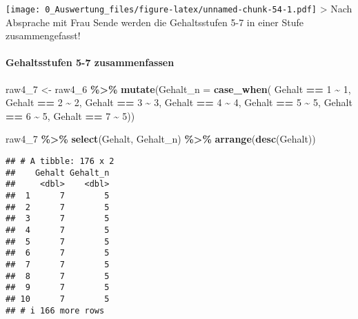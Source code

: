 \documentclass[
]{article}
\newenvironment{Shaded}{\begin{snugshade}}{\end{snugshade}}
\newcommand{\AttributeTok}[1]{\textcolor[rgb]{0.13,0.29,0.53}{#1}}
\newcommand{\DecValTok}[1]{\textcolor[rgb]{0.00,0.00,0.81}{#1}}
\newcommand{\FunctionTok}[1]{\textcolor[rgb]{0.13,0.29,0.53}{\textbf{#1}}}
\newcommand{\NormalTok}[1]{#1}
\newcommand{\OtherTok}[1]{\textcolor[rgb]{0.56,0.35,0.01}{#1}}
\newcommand{\SpecialCharTok}[1]{\textcolor[rgb]{0.81,0.36,0.00}{\textbf{#1}}}
\begin{document}
\texttt{[image: 0\_Auswertung\_files/figure-latex/unnamed-chunk-54-1.pdf]}
\textgreater{} Nach Absprache mit Frau Sende werden die Gehaltsstufen
5-7 in einer Stufe zusammengefasst!

\paragraph{Gehaltsstufen 5-7
zusammenfassen}\label{gehaltsstufen-5-7-zusammenfassen}

\begin{Shaded}
\begin{Highlighting}[]
\NormalTok{raw4\_7 }\OtherTok{\textless{}{-}}\NormalTok{ raw4\_6 }\SpecialCharTok{\%\textgreater{}\%} 
  \FunctionTok{mutate}\NormalTok{(}\AttributeTok{Gehalt\_n =} \FunctionTok{case\_when}\NormalTok{(}
\NormalTok{    Gehalt }\SpecialCharTok{==} \DecValTok{1} \SpecialCharTok{\textasciitilde{}} \DecValTok{1}\NormalTok{,}
\NormalTok{    Gehalt }\SpecialCharTok{==} \DecValTok{2} \SpecialCharTok{\textasciitilde{}} \DecValTok{2}\NormalTok{,}
\NormalTok{    Gehalt }\SpecialCharTok{==} \DecValTok{3} \SpecialCharTok{\textasciitilde{}} \DecValTok{3}\NormalTok{,}
\NormalTok{    Gehalt }\SpecialCharTok{==} \DecValTok{4} \SpecialCharTok{\textasciitilde{}} \DecValTok{4}\NormalTok{,}
\NormalTok{    Gehalt }\SpecialCharTok{==} \DecValTok{5} \SpecialCharTok{\textasciitilde{}} \DecValTok{5}\NormalTok{,}
\NormalTok{    Gehalt }\SpecialCharTok{==} \DecValTok{6} \SpecialCharTok{\textasciitilde{}} \DecValTok{5}\NormalTok{,}
\NormalTok{    Gehalt }\SpecialCharTok{==} \DecValTok{7} \SpecialCharTok{\textasciitilde{}} \DecValTok{5}\NormalTok{))}
\end{Highlighting}
\end{Shaded}

\begin{Shaded}
\begin{Highlighting}[]
\NormalTok{raw4\_7 }\SpecialCharTok{\%\textgreater{}\%} 
  \FunctionTok{select}\NormalTok{(Gehalt, Gehalt\_n) }\SpecialCharTok{\%\textgreater{}\%} 
  \FunctionTok{arrange}\NormalTok{(}\FunctionTok{desc}\NormalTok{(Gehalt))}
\end{Highlighting}
\end{Shaded}

\begin{verbatim}
## # A tibble: 176 x 2
##    Gehalt Gehalt_n
##     <dbl>    <dbl>
##  1      7        5
##  2      7        5
##  3      7        5
##  4      7        5
##  5      7        5
##  6      7        5
##  7      7        5
##  8      7        5
##  9      7        5
## 10      7        5
## # i 166 more rows
\end{verbatim}
\end{document}

